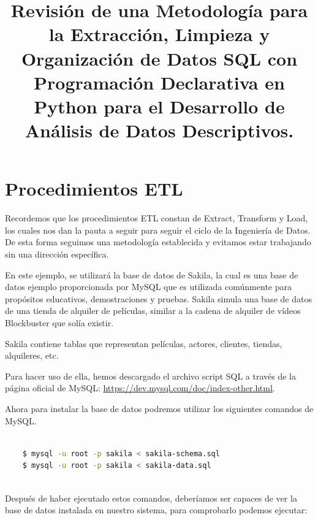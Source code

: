 \documentclass[12pt]{article}
\title{Revisión de una Metodología para la Extracción, Limpieza y Organización de Datos SQL con Programación Declarativa en Python para el Desarrollo de Análisis de Datos Descriptivos.}
\begin{document}
\maketitle

\section{Procedimientos ETL}

Recordemos que los procedimientos ETL constan de Extract, Transform y Load, los cuales nos dan la pauta a seguir para seguir el ciclo de la Ingeniería de Datos. De esta forma seguimos una metodología establecida y evitamos estar trabajando sin una dirección específica.

\vspace{12pt}

En este ejemplo, se utilizará la base de datos de Sakila, la cual es una base de datos ejemplo proporcionada por MySQL que es utilizada comúnmente para propósitos educativos, demostraciones y pruebas. Sakila simula una base de datos de una tienda de alquiler de películas, similar a la cadena de alquiler de vídeos Blockbuster que solía existir.

\vspace{12pt}

Sakila contiene tablas que representan películas, actores, clientes, tiendas, alquileres, etc.

\vspace{12pt}

Para hacer uso de ella, hemos descargado el archivo script SQL a través de la página oficial de MySQL: \url{https://dev.mysql.com/doc/index-other.html}.

\vspace{12pt}

Ahora para instalar la base de datos podremos utilizar los siguientes comandos de MySQL.

\vspace{12pt}
\begin{lstlisting}[language=Bash]
    
    $ mysql -u root -p sakila < sakila-schema.sql
    $ mysql -u root -p sakila < sakila-data.sql
    
\end{lstlisting}
\vspace{12pt}

Después de haber ejecutado estos comandos, deberíamos ser capaces de ver la base de datos instalada en nuestro sistema, para comprobarlo podemos ejecutar:
\end{document}
